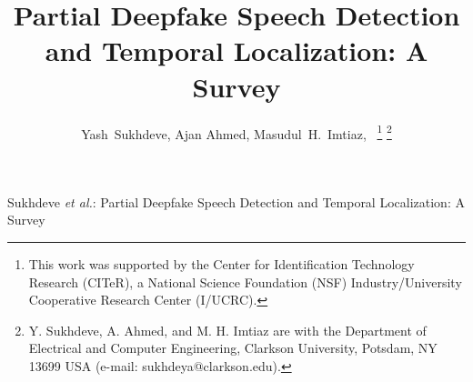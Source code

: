 \documentclass[journal]{IEEEtran}
\begin{document}
%
{Sukhdeve \MakeLowercase{\textit{et al.}}: Partial Deepfake Speech Detection and Temporal Localization: A Survey}

\title{Partial Deepfake Speech Detection and Temporal Localization: A Survey}

\author{Yash~Sukhdeve, Ajan Ahmed, Masudul~H.~Imtiaz,~%
\thanks{This work was supported by the Center for Identification Technology Research (CITeR), a National Science Foundation (NSF) Industry/University Cooperative Research Center (I/UCRC).}%
\thanks{Y. Sukhdeve, A. Ahmed, and M. H. Imtiaz are with the Department of Electrical and Computer Engineering, Clarkson University, Potsdam, NY 13699 USA (e-mail: sukhdeya@clarkson.edu).}}

\maketitle
\end{document}
